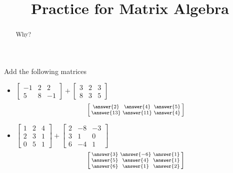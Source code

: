 \documentclass{ximera}
\title{Practice for Matrix Algebra}
\begin{document}
\begin{abstract}
Why?
\end{abstract}
\maketitle


\begin{exercise}
    Add the following matrices
    \begin{itemize}
    \item
    $\begin{bmatrix}
        -1 & 2 & 2 \\
        5 & 8 & -1
    \end{bmatrix}
    +
    \begin{bmatrix}
        3 & 2 & 3 \\
        8 & 3 & 5
    \end{bmatrix}$
    \[
        \left[\begin{smallmatrix} \answer{2} & \answer{4} & \answer{5} \\ \answer{13} & \answer{11} & \answer{4} \end{smallmatrix}\right]
    \]
    \item
    $\begin{bmatrix}
        1 & 2 & 4 \\
        2 & 3 & 1 \\
        0 & 5 & 1
    \end{bmatrix}
    +
    \begin{bmatrix}
        2 & -8 & -3 \\
        3 & 1 & 0 \\
        6 & -4 & 1
    \end{bmatrix}$
    \[
        \left[\begin{smallmatrix} \answer{3} & \answer{-6} & \answer{1} \\ \answer{5} & \answer{4} & \answer{1} \\ \answer{6} & \answer{1} & \answer{2} \end{smallmatrix}\right]
    \]
    \end{itemize}
\end{exercise}
\end{document}
